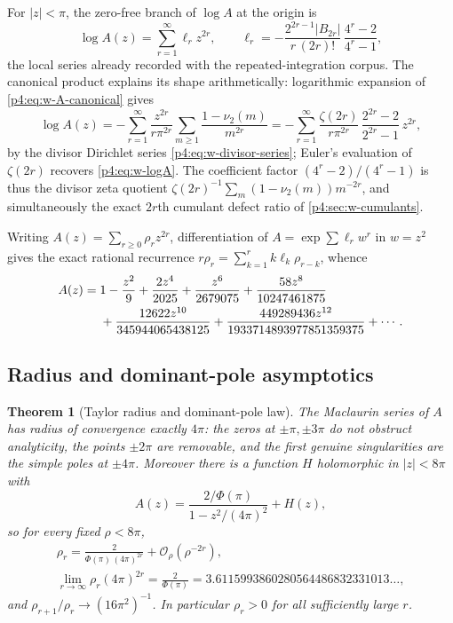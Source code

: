\documentclass[11pt,oneside]{article}
\numberwithin{equation}{section}
\newtheorem{theorem}{Theorem}[section]
\theoremstyle{definition}
\theoremstyle{remark}
\newcommand{\vtwo}{\nu_2}
\newcommand{\bigO}{\mathcal O}
\begin{document}
For $|z|<\pi$, the zero-free branch of $\log A$ at the origin is
\begin{equation}
 \log A(z)=\sum_{r=1}^{\infty}\ell_rz^{2r},
 \qquad
 \ell_r=-\frac{2^{2r-1}|B_{2r}|}{r\,(2r)!}\,
 \frac{4^r-2}{4^r-1},
 \label{p4:eq:w-logA}
\end{equation}
the local series already recorded with the repeated-integration corpus.
The canonical product explains its shape arithmetically: logarithmic
expansion of \eqref{p4:eq:w-A-canonical} gives
\begin{equation}
 \log A(z)
 =-\sum_{r=1}^{\infty}\frac{z^{2r}}{r\pi^{2r}}
 \sum_{m\ge1}\frac{1-\vtwo(m)}{m^{2r}}
 =-\sum_{r=1}^{\infty}
 \frac{\zeta(2r)}{r\pi^{2r}}\,\frac{2^{2r}-2}{2^{2r}-1}\,z^{2r},
 \label{p4:eq:w-logA-zeta}
\end{equation}
by the divisor Dirichlet series \eqref{p4:eq:w-divisor-series}; Euler's
evaluation of $\zeta(2r)$ recovers \eqref{p4:eq:w-logA}.  The coefficient
factor $(4^r-2)/(4^r-1)$ is thus the divisor zeta quotient
$\zeta(2r)^{-1}\sum_m(1-\vtwo(m))m^{-2r}$, and simultaneously the exact
$2r$th cumulant defect ratio of \cref{p4:sec:w-cumulants}.

Writing $A(z)=\sum_{r\ge0}\rho_rz^{2r}$, differentiation of
$A=\exp\sum\ell_rw^r$ in $w=z^2$ gives the exact rational recurrence
$r\rho_r=\sum_{k=1}^{r}k\ell_k\rho_{r-k}$, whence
\begin{align}
 A(z)={}&1-\frac{z^2}{9}+\frac{2z^4}{2025}
 +\frac{z^6}{2679075}
 +\frac{58z^8}{10247461875}\notag\\
 &+\frac{12622z^{10}}{345944065438125}
 +\frac{449289436z^{12}}{1933714893977851359375}+\cdots.
 \label{p4:eq:w-A-first-terms}
\end{align}

\subsection{Radius and dominant-pole asymptotics}

\begin{theorem}[Taylor radius and dominant-pole law]
\label{p4:thm:w-radius}
The Maclaurin series of $A$ has radius of convergence exactly $4\pi$: the
zeros at $\pm\pi,\pm3\pi$ do not obstruct analyticity, the points $\pm2\pi$
are removable, and the first genuine singularities are the simple poles at
$\pm4\pi$.  Moreover there is a function $H$ holomorphic in $|z|<8\pi$ with
\begin{equation}
 A(z)=\frac{2/\Phi(\pi)}{1-z^2/(4\pi)^2}+H(z),
 \label{p4:eq:w-pole-split}
\end{equation}
so for every fixed $\rho<8\pi$,
\begin{equation}
\begin{gathered}
 \rho_r=\frac{2}{\Phi(\pi)\,(4\pi)^{2r}}
 +\bigO_\rho(\rho^{-2r}),\\
 \lim_{r\to\infty}\rho_r(4\pi)^{2r}=\frac{2}{\Phi(\pi)}
 =3.6115993860280564486832331013\ldots,
\end{gathered}
 \label{p4:eq:w-rho-asymptotic}
\end{equation}
and $\rho_{r+1}/\rho_r\to(16\pi^2)^{-1}$.  In particular $\rho_r>0$ for all
sufficiently large $r$.
\end{theorem}
\end{document}
